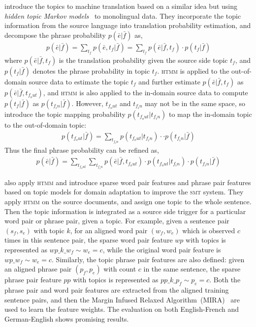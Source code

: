 \citet{su-12} introduce the topics to machine translation based on a similar idea but using \emph{hidden topic Markov models}~\citep[\textsc{htmm}]{gruber-07} to monolingual data. They incorporate the topic information from the source language into translation probability estimation, and decompose the phrase probability $p(\bar{e}|\bar{f})$ as,
\begin{align}
p(\bar{e}|\bar{f}) = \sum_{t_f} p(\bar{e}, t_f | \bar{f}) = \sum_{t_f} p(\bar{e} | \bar{f}, t_f) \cdot p(t_f | \bar{f})
\end{align}
where $p(\bar{e} | \bar{f}, t_f)$ is the translation probability given the source side topic $t_f$, and $p(t_f | \bar{f})$ denotes the phrase probability in topic $t_f$. \textsc{htmm} is applied to the out-of-domain source data to estimate the topic $t_f$ and further estimate $p(\bar{e} | \bar{f}, t_f)$ as $p(\bar{e} | \bar{f}, t_{f_out})$, and \textsc{htmm} is also applied to the in-domain source data to compute $p(t_f | \bar{f})$ as $p(t_{f_in} | \bar{f})$. However, $t_{f_out}$ and $t_{f_in}$ may not be in the same space, so \citet{su-12} introduce the topic mapping probability $p(t_{f_out} | t_{f_in})$ to map the in-domain topic to the out-of-domain topic:
\begin{align}
p(t_{f_out} | \bar{f}) = \sum_{t_{f_in}} p(t_{f_out} | t_{f_in}) \cdot \cdot p(t_{f_in} | \bar{f})
\end{align}
Thus the final phrase probability can be refined as,
\begin{align}
p(\bar{e}|\bar{f}) = \sum_{t_{f_out}} \sum_{t_{f_in}} p(\bar{e} | \bar{f}, t_{f_out}) \cdot p(t_{f_out} | t_{f_in}) \cdot p(t_{f_in} | \bar{f})
\end{align}

\citet{hasler-12} also apply \textsc{htmm} and introduce sparse word pair features and phrase pair features based on topic models for domain adaptation to improve the \textsc{smt} system. They apply \textsc{htmm} on the source documents, and assign one topic to the whole sentence. Then the topic information is integrated as a source side trigger for a particular word pair or phrase pair, given a topic. For  example, given a sentence pair $(s_f, s_e)$ with topic $k$, for an aligned word pair $(w_f, w_e)$ which is observed $c$ times in this sentence pair, the sparse word pair feature $wp$ with topics is represented as $wp\_k\_w_f \sim w_e = c$, while the original word pair feature is $wp\_w_f \sim w_e = c$. Similarly, the topic phrase pair features are also defined: given an aligned phrase pair $(p_f, p_e)$ with count $c$ in the same sentence, the sparse phrase pair feature $pp$ with topics is represented as $pp\_k\_p_f \sim p_e = c$. Both the phrase pair and word pair features are extracted from the aligned training sentence pairs, and then the Margin Infused Relaxed Algorithm~(MIRA)~\citep{Crammer-06} are used to learn the feature weights. The evaluation on both English-French and German-English shows promising results.

